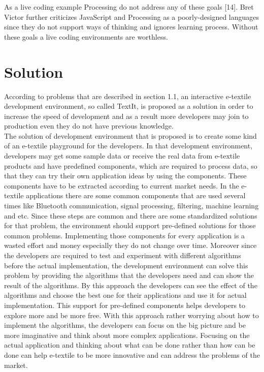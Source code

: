 As a live coding example Processing do not address any of these goals [14]. Bret Victor further criticizes JavaScript and Processing as a poorly-designed languages since they do not support ways of thinking and ignores learning process. Without these goals a live coding environments are worthless.

\section{Solution}

According to problems that are described in section 1.1, an interactive e-textile development environment, so called TextIt, is proposed as a solution in order to increase the speed of development and as a result more developers may join to production even they do not have previous knowledge. \\ 


The solution of development environment that is proposed is to create some kind of an e-textile playground for the developers. In that development environment, developers may get some sample data or receive the real data from e-textile products and have predefined components, which are required to process data, so that they can try their own application ideas by using the components. These components have to be extracted according to current market needs. In the e-textile applications there are some common components that are used several times like Bluetooth communication, signal processing, filtering, machine learning and etc. Since these steps are common and there are some standardized solutions for that problem, the environment should support pre-defined solutions for those common problems. Implementing those components for every application is a wasted effort and money especially they do not change over time. Moreover since the developers are required to test and experiment with different algorithms before the actual implementation, the development environment can solve this problem by providing the algorithms that the developers need and can show the result of the algorithms. By this approach the developers can see the effect of the algorithms and choose the best one for their applications and use it for actual implementation. This support for pre-defined components helps developers to explore more and be more free. With this approach rather worrying about how to implement the algorithms, the developers can focus on the big picture and be more imaginative and think about more complex applications. Focusing on the actual application and thinking about what can be done rather than how can be done can help e-textile to be more innovative and can address the problems of the market. \\

